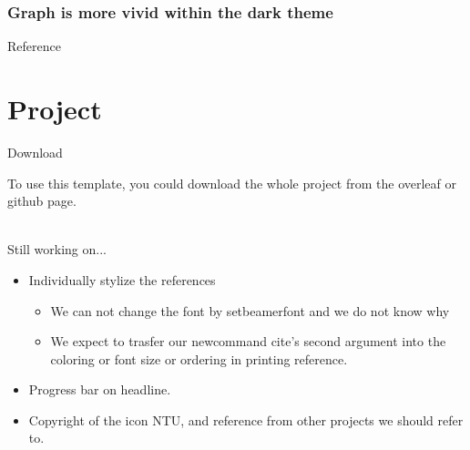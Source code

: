 \documentclass[pdf]{beamer}
\begin{document}
\begin{darkframe}
\frametitle{Graph is more vivid within the dark theme}
\end{darkframe}

\begin{frame}[t, allowframebreaks]{Reference}

\printbibliography
    
    
\end{frame}

\section{Project}


\begin{frame}{Download}

    To use this template, you could download the whole project from
    the overleaf or github page.\\
    \href{https://www.overleaf.com/read/qppxwpysgjmv}{}~~
    \href{https://github.com/liangchenn/ntu-beamer-template}{\faGithub}
    
\end{frame}


\begin{frame}{Still working on...}

\begin{itemize}
    \item Individually stylize the references
    \begin{itemize}
        \item We can not change the font by setbeamerfont and we do not know why 
        \item We expect to trasfer our newcommand cite's second argument into the coloring or font size or ordering in printing reference. 
    \end{itemize}
    \item Progress bar on headline.
    \item Copyright of the icon NTU, and reference from other projects we should refer to.
    
\end{itemize}
    
\end{frame}
\end{document}
